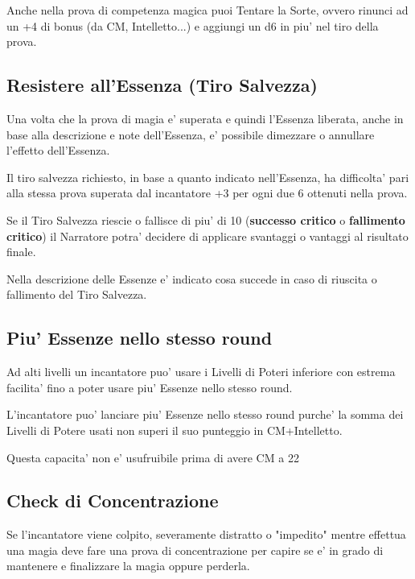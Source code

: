 \documentclass[a4paper,11pt,twoside,openany]{book}
\begin{document}
Anche nella prova di competenza magica puoi Tentare la Sorte, ovvero rinunci ad un +4 di bonus (da CM, Intelletto...) e aggiungi un d6 in piu' nel tiro della prova.

\subsection{Resistere all'Essenza (Tiro Salvezza)}

\label{resistere-allessenza-tiro-salvezza}

Una volta che la prova di magia e' superata e quindi l'Essenza liberata, anche in base alla descrizione e note dell'Essenza, e' possibile dimezzare o annullare l'effetto dell'Essenza.

Il tiro salvezza richiesto, in base a quanto indicato nell'Essenza, ha difficolta' pari alla stessa prova superata dal incantatore +3 per ogni due 6 ottenuti nella prova.

Se il Tiro Salvezza riescie o fallisce di piu' di 10 (\textbf{successo critico} o \textbf{fallimento critico}) il Narratore potra' decidere di applicare svantaggi o vantaggi al risultato finale.

Nella descrizione delle Essenze e' indicato cosa succede in caso di riuscita o fallimento del Tiro Salvezza.

\subsection{Piu' Essenze nello stesso round}

Ad alti livelli un incantatore puo' usare i Livelli di Poteri inferiore con estrema facilita' fino a poter usare piu' Essenze nello stesso round.

L'incantatore puo' lanciare piu' Essenze nello stesso round purche' la somma dei Livelli di Potere usati non superi il suo punteggio in CM+Intelletto.

Questa capacita' non e' usufruibile prima di avere CM a 22

\subsection{Check di Concentrazione}

Se l'incantatore viene colpito, severamente distratto o "impedito" mentre effettua una magia deve fare una prova di concentrazione per capire se e' in grado di mantenere e finalizzare la magia oppure perderla.
\end{document}
